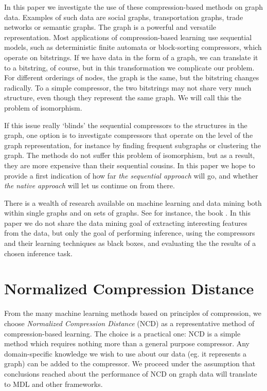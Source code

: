 \documentclass{article}
\begin{document}
In this paper we investigate the use of these compression-based methods on graph data. Examples of such data are social graphs, transportation graphs, trade networks or semantic graphs. The graph is a powerful and versatile representation. Most applications of compression-based learning use sequential models, such as deterministic finite automata or block-sorting compressors, which operate on bitstrings. If we have data in the form of a graph, we can translate it to a bitstring, of course, but in this transformation we complicate our problem. For different orderings of nodes, the graph is the same, but the bitstring changes radically. To a simple compressor, the two bitstrings may not share very much structure, even though they represent the same graph. We will call this the problem of isomorphism.

If this issue really `blinds' the sequential compressors to the structures in the graph, one option is to investigate compressors that operate on the level of the graph representation, for instance by finding frequent subgraphs or clustering the graph. The methods do not suffer this problem of isomorphism, but as a result, they are more expensive than their sequential cousins. In this paper we hope to provide a first indication of how far \emph{the sequential approach} will go, and whether \emph{the native approach} will let us continue on from there.

There is a wealth of research available on machine learning and data mining both within single graphs and on sets of graphs. See for instance, the book \cite{cook2006mining}. In this paper we do not share the data mining goal of extracting interesting features from the data, but only the goal of performing inference, using the compressors and their learning techniques as black boxes, and evaluating the the results of a chosen inference task. 

\section*{Normalized Compression Distance}

From the many machine learning methods based on principles of compression, we choose \emph{Normalized Compression Distance} (NCD) as a representative method of compression-based learning. The choice is a practical one: NCD is a simple method which requires nothing more than a general purpose compressor. Any domain-specific knowledge we wish to use about our data (eg. it represents a graph) can be added to the compressor. We proceed under the assumption that conclusions reached about the performance of NCD on graph data will translate to MDL and other frameworks.
\end{document}
